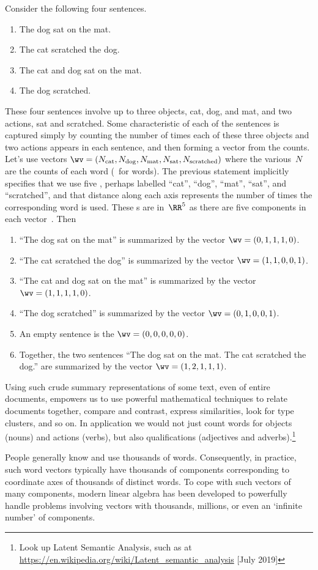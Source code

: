 \begin{example} \label{eg:deflsv}
Consider the following four sentences.
\begin{enumerate}
\item The dog sat on the mat.
\item The cat scratched the dog.
\item The cat and dog sat on the mat.
\item The dog scratched.
\end{enumerate}
These four sentences involve up to three objects, cat, dog, and mat, and two actions, sat and scratched.  
Some characteristic of each of the sentences is captured simply by counting the number of times each of these three objects and two actions appears in each sentence, and then forming a vector from the counts.
Let's use vectors \(\sloppy\wv=(N_{\text{cat}}, N_{\text{dog}}, N_{\text{mat}}, N_{\text{sat}}, N_{\text{scratched}})\) where the various~\(N\) are the counts of each word (\wv~for words). 
The previous statement implicitly specifies that we use five , perhaps labelled ``cat'', ``dog'', ``mat'', ``sat'', and ``scratched'', and that distance along each axis represents the number of times the corresponding word is used.
These s are in~\(\RR^5\) as there are five components in each vector~\wv.
Then
\begin{enumerate}
\item ``The dog sat on the mat'' is summarized by the vector \(\wv=(0,1,1,1,0)\).
\item ``The cat scratched the dog'' is summarized by the vector \(\wv=(1,1,0,0,1)\).
\item ``The cat and dog sat on the mat'' is summarized by the vector \(\wv=(1,1,1,1,0)\).
\item ``The dog scratched'' is summarized by the vector \(\wv=(0,1,0,0,1)\).
\item An empty sentence is the  \(\wv=(0,0,0,0,0)\).
\item Together, the two sentences ``The dog sat on the mat.
 The cat scratched the dog.'' are summarized by the vector \(\wv=(1,2,1,1,1)\).
\end{enumerate}
Using such crude summary representations of some text, even of entire documents, empowers us to use powerful mathematical techniques to relate documents together, compare and contrast, express similarities, look for type clusters, and so on.
In application we would not just count words for objects (nouns) and actions (verbs), but also qualifications (adjectives and adverbs).\footnote{Look up Latent Semantic Analysis, such as at \url{https://en.wikipedia.org/wiki/Latent_semantic_analysis} [July 2019]}

People generally know and use thousands of words.
Consequently, in practice, such word vectors typically have thousands of components corresponding to coordinate axes of thousands of distinct words.
To cope with such vectors of many components, modern linear algebra has been developed to powerfully handle problems involving vectors with thousands, millions, or even an `infinite number' of components.
\end{example}

